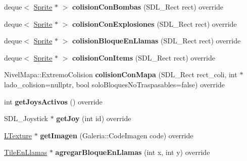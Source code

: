 \begin{DoxyCompactItemize}
\item 
deque$<$ \hyperlink{class_sprite}{Sprite} $\ast$ $>$ {\bfseries colision\+Con\+Bombas} (S\+D\+L\+\_\+\+Rect rect) override\hypertarget{class_juego_a4af8340331254c695a0258f22284efe6}{}\label{class_juego_a4af8340331254c695a0258f22284efe6}

\item 
deque$<$ \hyperlink{class_sprite}{Sprite} $\ast$ $>$ {\bfseries colision\+Con\+Explosiones} (S\+D\+L\+\_\+\+Rect rect) override\hypertarget{class_juego_a220161dcde1e991619ac218de9354c5b}{}\label{class_juego_a220161dcde1e991619ac218de9354c5b}

\item 
deque$<$ \hyperlink{class_sprite}{Sprite} $\ast$ $>$ {\bfseries colision\+Bloque\+En\+Llamas} (S\+D\+L\+\_\+\+Rect rect) override\hypertarget{class_juego_a7226f7dd36ef3519b170035afd8ce943}{}\label{class_juego_a7226f7dd36ef3519b170035afd8ce943}

\item 
deque$<$ \hyperlink{class_sprite}{Sprite} $\ast$ $>$ {\bfseries colision\+Con\+Items} (S\+D\+L\+\_\+\+Rect rect) override\hypertarget{class_juego_a0d676fd93f16aff9c9e53fe062b4cbe3}{}\label{class_juego_a0d676fd93f16aff9c9e53fe062b4cbe3}

\item 
Nivel\+Mapa\+::\+Extremo\+Colision {\bfseries colision\+Con\+Mapa} (S\+D\+L\+\_\+\+Rect rect\+\_\+coli, int $\ast$lado\+\_\+colision=nullptr, bool solo\+Bloques\+No\+Traspasables=false) override\hypertarget{class_juego_afc0afb5a5d8dbdc01e15e37c75c77a66}{}\label{class_juego_afc0afb5a5d8dbdc01e15e37c75c77a66}

\item 
int {\bfseries get\+Joys\+Activos} () override\hypertarget{class_juego_a05efa90df1ec93452c715a5da3a88533}{}\label{class_juego_a05efa90df1ec93452c715a5da3a88533}

\item 
S\+D\+L\+\_\+\+Joystick $\ast$ {\bfseries get\+Joy} (int id) override\hypertarget{class_juego_a5bc4a7e470c19d414db169694d0c7775}{}\label{class_juego_a5bc4a7e470c19d414db169694d0c7775}

\item 
\hyperlink{class_l_texture}{L\+Texture} $\ast$ {\bfseries get\+Imagen} (Galeria\+::\+Code\+Imagen code) override\hypertarget{class_juego_a930b36da4b43ff9c9679450fc90b9b8d}{}\label{class_juego_a930b36da4b43ff9c9679450fc90b9b8d}

\item 
\hyperlink{class_tile_en_llamas}{Tile\+En\+Llamas} $\ast$ {\bfseries agregar\+Bloque\+En\+Llamas} (int x, int y) override\hypertarget{class_juego_ab2fc0a295438ebf00813fa36496d0259}{}\label{class_juego_ab2fc0a295438ebf00813fa36496d0259}


\end{DoxyCompactItemize}
